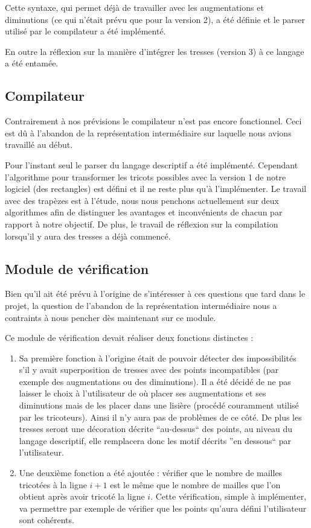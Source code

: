 \documentclass{article}
\begin{document}
Cette syntaxe, qui permet déjà de travailler avec les augmentations et diminutions (ce qui n'était prévu que pour la version 2), a été définie et le parser utilisé par le compilateur a été implémenté.

En outre la réflexion sur la manière d'intégrer les tresses (version 3) à ce langage a été entamée. %


\subsection{Compilateur}

Contrairement à nos prévisions le compilateur n'est pas encore fonctionnel. Ceci est dû à l'abandon de la représentation intermédiaire sur laquelle nous avions travaillé au début.

Pour l'instant seul le parser du langage descriptif a été implémenté. Cependant l'algorithme pour transformer les tricots possibles avec la version 1 de notre logiciel (des rectangles) est défini et il ne reste plus qu'à l'implémenter. Le travail avec des trapèzes est à l'étude, nous nous penchons actuellement sur deux algorithmes afin de distinguer les avantages et inconvénients de chacun par rapport à notre objectif. %
De plus, le travail de réflexion sur la compilation lorsqu'il y aura des tresses a déjà commencé.

\subsection{Module de vérification}

Bien qu'il ait été prévu à l'origine de s'intéresser à ces questions que tard dans le projet, la question de l'abandon de la représentation intermédiaire nous a contraints à nous pencher dès maintenant sur ce module.

Ce module de vérification devait réaliser deux fonctions distinctes :

\begin{enumerate}
 \item Sa première fonction à l'origine était de pouvoir détecter des impossibilités s'il y avait superposition de tresses avec des points incompatibles (par exemple des augmentations ou des diminutions). Il a été décidé de ne pas laisser le choix à l'utilisateur de où placer ses augmentations et ses diminutions mais de les placer dans une lisière (procédé couramment utilisé par les tricoteurs). Ainsi il n'y aura pas de problèmes de ce côté. De plus les tresses seront une décoration décrite ``au-dessus`` des points, au niveau du langage descriptif, elle remplacera donc les motif décrits ''en dessous`` par l'utilisateur.

 \item Une deuxième fonction a été ajoutée : vérifier que le nombre de mailles tricotées à la ligne $i+1$ est le même que le nombre de mailles que l'on obtient après avoir tricoté la ligne $i$. Cette vérification, simple à implémenter, va permettre par exemple de vérifier que les points qu'aura défini l'utilisateur sont cohérents.
\end{enumerate}
\end{document}
